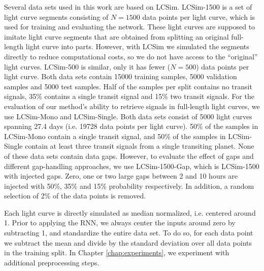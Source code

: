 Several data sets used in this work are based on LCSim. LCSim-1500 is a set of light curve segments consisting of $N=1500$ data points per light curve, which is used for training and evaluating the network. These light curves are supposed to imitate light curve segments that are obtained from splitting an original full-length light curve into parts. However, with LCSim we simulated the segments directly to reduce computational costs, so we do not have access to the ``original'' light curves. LCSim-500 is similar, only it has fewer ($N=500$) data points per light curve. Both data sets contain 15000 training samples, 5000 validation samples and 5000 test samples. Half of the samples per split contains no transit signals, 35\% contains a single transit signal and 15\% two transit signals. For the evaluation of our method's ability to retrieve signals in full-length light curves, we use LCSim-Mono and LCSim-Single. Both data sets consist of 5000 light curves spanning 27.4 days (i.e. 19728 data points per light curve). 50\% of the samples in LCSim-Mono contain a single transit signal, and 50\% of the samples in LCSim-Single contain at least three transit signals from a single transiting planet. None of these data sets contain data gaps. However, to evaluate the effect of gaps and different gap-handling approaches, we use LCSim-1500-Gap, which is LCSim-1500 with injected gaps. Zero, one or two large gaps between 2 and 10 hours are injected with 50\%, 35\% and 15\% probability respectively. In addition, a random selection of 2\% of the data points is removed.

Each light curve is directly simulated as median normalized, i.e. centered around 1. Prior to applying the RNN, we always center the inputs around zero by subtracting 1, and standardize the entire data set. To do so, for each data point we subtract the mean and divide by the standard deviation over all data points in the training split. In Chapter \ref{chap:experiments}, we experiment with additional preprocessing steps.



